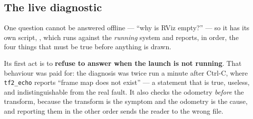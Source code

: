 \subsection{The live diagnostic}

One question cannot be answered offline --- ``why is RViz empty?'' --- so
it has its own script, , which runs
against the \emph{running} system and reports, in order, the four things
that must be true before anything is drawn.

Its first act is to \textbf{refuse to answer when the launch is not
running}. That behaviour was paid for: the diagnosis was twice run a
minute after Ctrl-C, where \texttt{tf2\_echo} reports ``frame map does
not exist'' --- a statement that is true, useless, and indistinguishable
from the real fault. It also checks the odometry \emph{before} the
transform, because the transform is the symptom and the odometry is the
cause, and reporting them in the other order sends the reader to the
wrong file.
